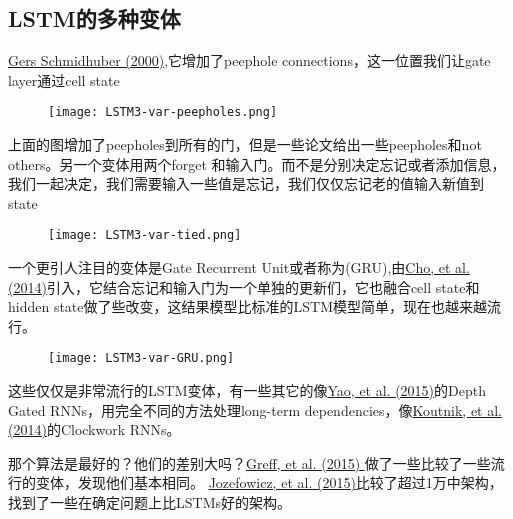 \subsection{LSTM的多种变体}
\href{ftp://ftp.idsia.ch/pub/juergen/TimeCount-IJCNN2000.pdf}{Gers  Schmidhuber (2000)},它增加了peephole connections，这一位置我们让gate layer通过cell state
\begin{figure}
\centering
\texttt{[image: LSTM3-var-peepholes.png]}
\end{figure}
上面的图增加了peepholes到所有的门，但是一些论文给出一些peepholes和not others。另一个变体用两个forget 和输入门。而不是分别决定忘记或者添加信息，我们一起决定，我们需要输入一些值是忘记，我们仅仅忘记老的值输入新值到state
\begin{figure}
\centering
\texttt{[image: LSTM3-var-tied.png]}
\end{figure}
一个更引人注目的变体是Gate Recurrent Unit或者称为(GRU),由\href{http://arxiv.org/pdf/1406.1078v3.pdf}{Cho, et al. (2014)}引入，它结合忘记和输入门为一个单独的更新们，它也融合cell state和hidden state做了些改变，这结果模型比标准的LSTM模型简单，现在也越来越流行。
\begin{figure}
\centering
\texttt{[image: LSTM3-var-GRU.png]}
\end{figure}
这些仅仅是非常流行的LSTM变体，有一些其它的像\href{http://arxiv.org/pdf/1508.03790v2.pdf}{Yao, et al. (2015)}的Depth Gated RNNs，用完全不同的方法处理long-term dependencies，像\href{http://arxiv.org/pdf/1402.3511v1.pdf}{Koutnik, et al. (2014)}的Clockwork RNNs。\par
那个算法是最好的？他们的差别大吗？\href{http://arxiv.org/pdf/1503.04069.pdf}{Greff, et al. (2015) }做了一些比较了一些流行的变体，发现他们基本相同。
\href{http://jmlr.org/proceedings/papers/v37/jozefowicz15.pdf}{Jozefowicz, et al. (2015)}比较了超过1万中架构，找到了一些在确定问题上比LSTMs好的架构。
